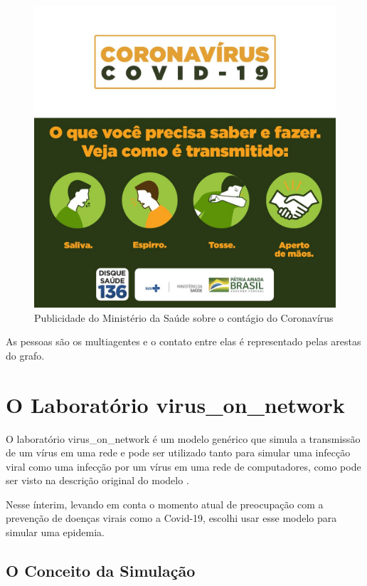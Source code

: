 \begin{figure}[H]
    \centering
    \includegraphics[angle=0,width=1\textwidth]{exploratory-data-analysis/seraphritt/PesqBibliogr/Virus-Network/ESI4oudXkAAFOZk.jpg}
    \caption{Publicidade do Ministério da Saúde sobre o contágio do Coronavírus}
    \label{fig:seraphritt:MinSaude}
\end{figure}

As pessoas são os multiagentes e o contato entre elas é representado pelas arestas do grafo.

\section{O Laboratório virus\_on\_network}

O laboratório virus\_on\_network é um modelo genérico que simula a transmissão de um vírus em uma rede e pode ser utilizado tanto para simular uma infecção viral como uma infecção por um vírus em uma rede de computadores, como pode ser visto na descrição original do modelo \cite{f_stonedahl_netlogo_2008}.

Nesse ínterim, levando em conta o momento atual de preocupação com a prevenção de doenças virais como a Covid-19, escolhi usar esse modelo para simular uma epidemia. 

\subsection{O Conceito da Simulação}

